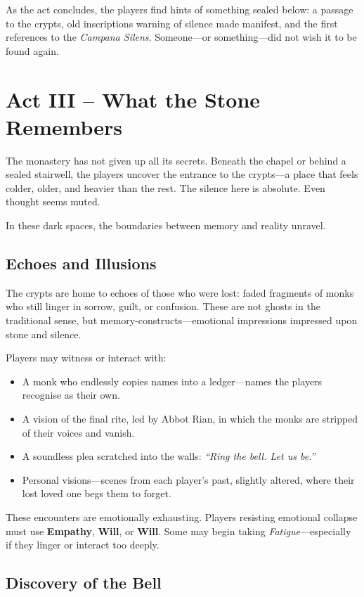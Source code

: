 \documentclass[nodeprecatedcode,bg=print]{dndbook/dndbook}
\begin{document}
As the act concludes, the players find hints of something sealed below: a passage to the crypts, old inscriptions warning of silence made manifest, and the first references to the \emph{Campana Silens}. Someone—or something—did not wish it to be found again.

\section*{Act III – What the Stone Remembers}

The monastery has not given up all its secrets. Beneath the chapel or behind a sealed stairwell, the players uncover the entrance to the crypts—a place that feels colder, older, and heavier than the rest. The silence here is absolute. Even thought seems muted.

In these dark spaces, the boundaries between memory and reality unravel.

\subsection{Echoes and Illusions}

The crypts are home to echoes of those who were lost: faded fragments of monks who still linger in sorrow, guilt, or confusion. These are not ghosts in the traditional sense, but memory-constructs—emotional impressions impressed upon stone and silence.

Players may witness or interact with:
\begin{itemize}
    \item A monk who endlessly copies names into a ledger—names the players recognise as their own.
    \item A vision of the final rite, led by Abbot Rian, in which the monks are stripped of their voices and vanish.
    \item A soundless plea scratched into the walls: \emph{“Ring the bell. Let us be.”}
    \item Personal visions—scenes from each player’s past, slightly altered, where their lost loved one begs them to forget.
\end{itemize}

These encounters are emotionally exhausting. Players resisting emotional collapse must use \textbf{Empathy}, \textbf{Will}, or \textbf{Will}. Some may begin taking \emph{Fatigue}—especially if they linger or interact too deeply.

\subsection{Discovery of the Bell}
\end{document}
